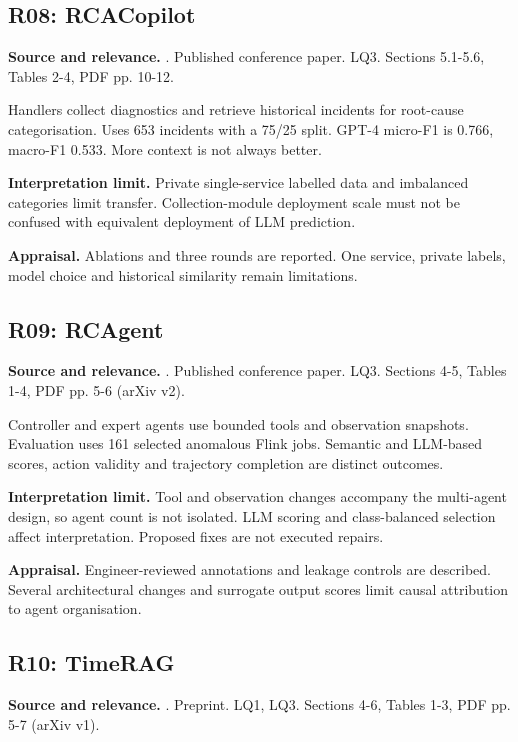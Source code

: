 \subsection{R08: RCACopilot}
\noindent\textbf{Source and relevance.} \parencite{chen2024rcacopilot}. Published conference paper. LQ3. Sections 5.1-5.6, Tables 2-4, PDF pp. 10-12.

Handlers collect diagnostics and retrieve historical incidents for root-cause categorisation. Uses 653 incidents with a 75/25 split. GPT-4 micro-F1 is 0.766, macro-F1 0.533. More context is not always better.

\noindent\textbf{Interpretation limit.} Private single-service labelled data and imbalanced categories limit transfer. Collection-module deployment scale must not be confused with equivalent deployment of LLM prediction.

\noindent\textbf{Appraisal.} Ablations and three rounds are reported. One service, private labels, model choice and historical similarity remain limitations.

\subsection{R09: RCAgent}
\noindent\textbf{Source and relevance.} \parencite{wang2024rcagent}. Published conference paper. LQ3. Sections 4-5, Tables 1-4, PDF pp. 5-6 (arXiv v2).

Controller and expert agents use bounded tools and observation snapshots. Evaluation uses 161 selected anomalous Flink jobs. Semantic and LLM-based scores, action validity and trajectory completion are distinct outcomes.

\noindent\textbf{Interpretation limit.} Tool and observation changes accompany the multi-agent design, so agent count is not isolated. LLM scoring and class-balanced selection affect interpretation. Proposed fixes are not executed repairs.

\noindent\textbf{Appraisal.} Engineer-reviewed annotations and leakage controls are described. Several architectural changes and surrogate output scores limit causal attribution to agent organisation.

\subsection{R10: TimeRAG}
\noindent\textbf{Source and relevance.} \parencite{park2026timerag}. Preprint. LQ1, LQ3. Sections 4-6, Tables 1-3, PDF pp. 5-7 (arXiv v1).

